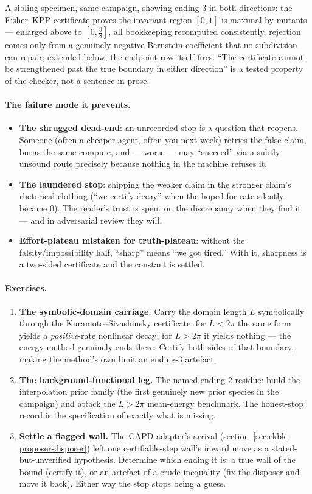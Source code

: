 A sibling specimen, same campaign, showing ending 3 in both directions:
the Fisher--KPP certificate proves the invariant region $[0,1]$ is
maximal by mutants --- enlarged above to $[0, \tfrac98]$, all
bookkeeping recomputed consistently, rejection comes only from a
genuinely negative Bernstein coefficient that no subdivision can repair;
extended below, the endpoint row itself fires. ``The certificate cannot
be strengthened past the true boundary in either direction'' is a
tested property of the checker, not a sentence in prose.

\paragraph{The failure mode it prevents.}
\begin{itemize}
\item \textbf{The shrugged dead-end}: an unrecorded stop is a question
  that reopens. Someone (often a cheaper agent, often you-next-week)
  retries the false claim, burns the same compute, and --- worse ---
  may ``succeed'' via a subtly unsound route precisely because nothing
  in the machine refuses it.
\item \textbf{The laundered stop}: shipping the weaker claim in the
  stronger claim's rhetorical clothing (``we certify decay'' when the
  hoped-for rate silently became $0$). The reader's trust is spent on
  the discrepancy when they find it --- and in adversarial review they
  will.
\item \textbf{Effort-plateau mistaken for truth-plateau}: without the
  falsity/impossibility half, ``sharp'' means ``we got tired.'' With
  it, sharpness is a two-sided certificate and the constant is
  settled.
\end{itemize}

\paragraph{Exercises.}
\begin{enumerate}
\item \textbf{The symbolic-domain carriage.} Carry the domain length
  $L$ symbolically through the Kuramoto--Sivashinsky certificate: for
  $L < 2\pi$ the same form yields a \emph{positive}-rate nonlinear
  decay; for $L > 2\pi$ it yields nothing --- the energy method
  genuinely ends there. Certify both sides of that boundary, making the
  method's own limit an ending-3 artefact.
\item \textbf{The background-functional leg.} The named ending-2
  residue: build the interpolation prior family (the first genuinely
  new prior species in the campaign) and attack the $L > 2\pi$
  mean-energy benchmark. The honest-stop record is the specification of
  exactly what is missing.
\item \textbf{Settle a flagged wall.} The CAPD adapter's arrival
  (section~\ref{sec:ckbk-proposer-disposer}) left one
  certifiable-step wall's inward move as a stated-but-unverified
  hypothesis. Determine which ending it is: a true wall of the bound
  (certify it), or an artefact of a crude inequality (fix the disposer
  and move it back). Either way the stop stops being a guess.
\end{enumerate}

